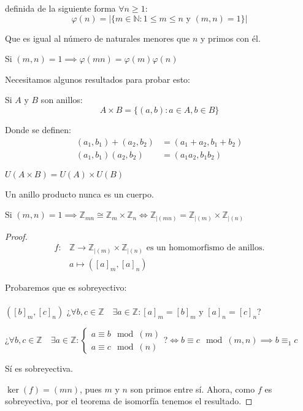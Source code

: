 definida de la siguiente forma $\forall n\ge 1$:
\[
  \varphi(n) = |\{m\in \mathbb{N} : 1\le m \le n \text{ y } (m,n)=1\}|
\]

Que es igual al número de naturales menores que $n$ y primos con él.

\begin{nprop}
  Si $(m,n) = 1 \implies \varphi(mn) = \varphi(m)\varphi(n)$
\end{nprop}

Necesitamos algunos resultados para probar esto:

\begin{ndef}
Si $A$ y $B$ son anillos:
\[
  A\times B = \{(a,b) : a\in A, b\in B\}
\]

Donde se definen:
\begin{align*}
  (a_1,b_1)+(a_2,b_2) &= (a_1+a_2, b_1+b_2)\\
  (a_1,b_1)(a_2,b_2) &= (a_1a_2, b_1b_2)
\end{align*}

$U(A\times B) = U(A)\times U(B)$

\end{ndef}

\begin{nota} Un anillo producto nunca es un cuerpo.

\end{nota}

\begin{nth}
Si $(m,n)=1 \implies \mathbb{Z}_{mn} \cong \mathbb{Z}_m \times \mathbb{Z}_n \iff \mathbb{Z}_{|(mn)} = \mathbb{Z}_{|(m)} \times \mathbb{Z}_{|(n)}$
\end{nth}

\begin{proof}
\begin{align*}
f:& \mathbb{Z} \longrightarrow \mathbb{Z}_{|(m)}\times \mathbb{Z}_{|(n)}\text{ es un homomorfismo de anillos.}\\
& a \longmapsto ([a]_m, [a]_n)
\end{align*}

Probaremos que es sobreyectivo:\\\\
$([b]_m,[c]_n)$ ¿$\forall b,c \in \mathbb{Z}\quad \exists a \in \mathbb{Z} : [a]_m = [b]_m \text{ y } [a]_n = [c]_n$?

¿$\forall b,c \in \mathbb{Z}\quad \exists a \in \mathbb{Z} : \begin{cases}
  a \equiv b \mod(m)\\
  a \equiv c \mod(n)
\end{cases}$?$ \iff b \equiv c \mod(m,n) \implies b \equiv_1 c$

Sí es sobreyectiva.

$\ker(f) = (mn)$, pues $m$ y $n$ son primos entre sí. Ahora, como $f$ es sobreyectiva, por el teorema de isomorfía tenemos el resultado.
\end{proof}


